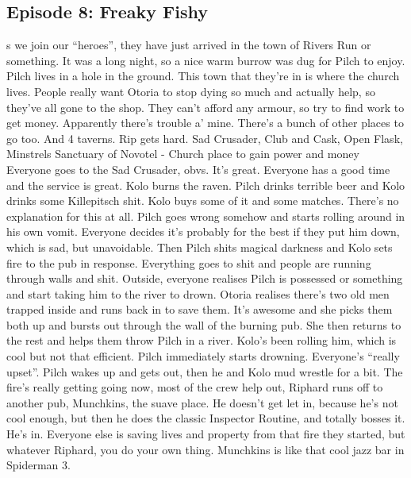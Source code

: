 \subsection{Episode 8: Freaky Fishy}
s we join our “heroes”, they have just arrived in the town of Rivers Run or something. It was a long night, so a nice warm burrow was dug for Pilch to enjoy. Pilch lives in a hole in the ground.\medskip
This town that they’re in is where the church lives.\medskip
People really want Otoria to stop dying so much and actually help, so they’ve all gone to the shop.\medskip
They can’t afford any armour, so try to find work to get money. Apparently there’s trouble a’ mine.\medskip
There’s a bunch of other places to go too.\medskip
And 4 taverns. Rip gets hard.\medskip
Sad Crusader, Club and Cask, Open Flask, Minstrels\medskip
Sanctuary of Novotel - Church place to gain power and money\medskip
Everyone goes to the Sad Crusader, obvs.\medskip
It’s great. Everyone has a good time and the service is great.\medskip
Kolo burns the raven.\medskip
Pilch drinks terrible beer and Kolo drinks some Killepitsch shit.\medskip
Kolo buys some of it and some matches. There’s no explanation for this at all.\medskip
Pilch goes wrong somehow and starts rolling around in his own vomit.\medskip
Everyone decides it’s probably for the best if they put him down, which is sad, but unavoidable.\medskip
Then Pilch shits magical darkness and Kolo sets fire to the pub in response.\medskip
Everything goes to shit and people are running through walls and shit.\medskip
Outside, everyone realises Pilch is possessed or something and start taking him to the river to drown.\medskip
Otoria realises there’s two old men trapped inside and runs back in to save them. It’s awesome and she picks them both up and bursts out through the wall of the burning pub.\medskip
She then returns to the rest and helps them throw Pilch in a river. Kolo’s been rolling him, which is cool but not that efficient.\medskip
Pilch immediately starts drowning. Everyone’s “really upset”.\medskip
Pilch wakes up and gets out, then he and Kolo mud wrestle for a bit.\medskip
The fire’s really getting going now, most of the crew help out, Riphard runs off to another pub, Munchkins, the suave place.\medskip
He doesn’t get let in, because he’s not cool enough, but then he does the classic Inspector Routine, and totally bosses it.\medskip
He’s in.\medskip
Everyone else is saving lives and property from that fire they started, but whatever Riphard, you do your own thing.\medskip
Munchkins is like that cool jazz bar in Spiderman 3.\medskip
